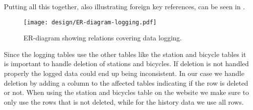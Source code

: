 Putting all this together, also illustrating foreign key references, can be seen in .

\begin{figure}
\texttt{[image: design/ER-diagram-logging.pdf]}
\vspace*{-2cm}
\caption{ER-diagram showing relations covering data logging.}\label{fig:er-dia-log}
\end{figure}

Since the logging tables use the other tables like the station and bicycle tables it is important to handle deletion of stations and bicycles. 
If deletion is not handled properly the logged data could end up being inconsistent. 
In our case we handle deletion by adding a column to the affected tables indicating if the row is deleted or not. 
When using the station and bicycles table on the website we make sure to only use the rows that is not deleted, while for the history data we use all rows.
